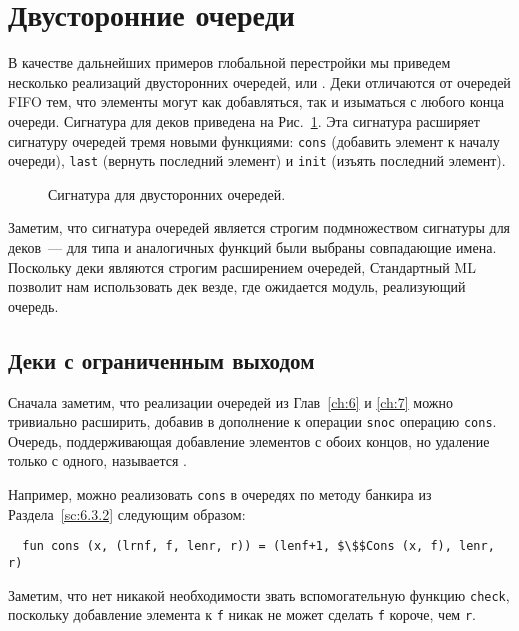 \section{Двусторонние очереди}
\label{sc:8.4}

В качестве дальнейших примеров глобальной перестройки мы приведем
несколько реализаций двусторонних очередей, или
. Деки отличаются от очередей FIFO тем, что
элементы могут как добавляться, так и изыматься с любого конца
очереди. Сигнатура для деков приведена на Рис.~\ref{fig:8.2}. Эта
сигнатура расширяет сигнатуру очередей тремя новыми функциями:
\lstinline!cons! (добавить элемент к началу очереди), \lstinline!last!
(вернуть последний элемент) и \lstinline!init! (изъять последний
элемент).

\begin{figure}
  \centering
  
  \caption{Сигнатура для двусторонних очередей.}
  \label{fig:8.2}
\end{figure}

\begin{remark}
  Заметим, что сигнатура очередей является строгим подмножеством
  сигнатуры для деков~--- для типа и аналогичных функций были выбраны
  совпадающие имена. Поскольку деки являются строгим расширением
  очередей, Стандартный ML позволит нам использовать дек везде, где
  ожидается модуль, реализующий очередь.
\end{remark}

\subsection{Деки с ограниченным выходом}
\label{sc:8.4.2}

Сначала заметим, что реализации очередей из Глав~\ref{ch:6} и
\ref{ch:7} можно тривиально расширить, добавив в дополнение к операции
\lstinline!snoc! операцию \lstinline!cons!. Очередь, поддерживающая
добавление элементов с обоих концов, но удаление только с одного,
называется .

Например, можно реализовать \lstinline!cons! в очередях по методу
банкира из Раздела~\ref{sc:6.3.2} следующим образом:
\begin{lstlisting}
  fun cons (x, (lrnf, f, lenr, r)) = (lenf+1, $\$$Cons (x, f), lenr, r)
\end{lstlisting}
Заметим, что нет никакой необходимости звать вспомогательную функцию
\lstinline!check!, поскольку добавление элемента к \lstinline!f! никак
не может сделать \lstinline!f! короче, чем \lstinline!r!.

